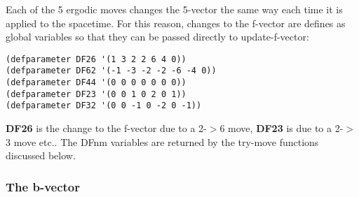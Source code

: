 \documentclass[12pt]{article}
\begin{document}
Each of the 5 ergodic moves changes the 5-vector the same way each
time it is applied to the spacetime. For this reason, changes to the
f-vector are defines as global variables so that they can be passed
directly to update-f-vector:
\begin{lstlisting}
(defparameter DF26 '(1 3 2 2 6 4 0))
(defparameter DF62 '(-1 -3 -2 -2 -6 -4 0))
(defparameter DF44 '(0 0 0 0 0 0 0))
(defparameter DF23 '(0 0 1 0 2 0 1))
(defparameter DF32 '(0 0 -1 0 -2 0 -1))
\end{lstlisting}
\textbf{DF26} is the change to the f-vector due to a 2-$>$6 move,
\textbf{DF23} is due to a 2-$>$3 move etc.. The DFnm variables are
returned by the try-move functions discussed below.

\subsubsection{The b-vector}
\end{document}
